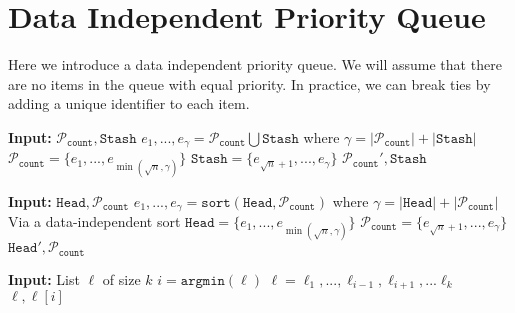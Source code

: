 \section{Data Independent Priority Queue}
Here we introduce a data independent priority queue. We will assume that there are no items in the queue
with equal priority. In practice, we can break ties by adding a unique identifier to each item.

\newcommand{\DIPQhead}{\texttt{Head}}
\newcommand{\DIPQstash}{\texttt{Stash}}
\newcommand{\DIPQcounter}{{\texttt{count}}}
\newcommand{\DIPQpartition}{\mathcal{P}}
\newcommand{\MergeFill}{\texttt{MergeFill}}
\newcommand{\Fill}{\texttt{Fill}}
\newcommand{\ExtractSmallest}{\texttt{ExtractSmallest}}
\newcommand{\sqrtn}{{\sqrt{n}}}
\newcommand{\good}{\mathcal{G}}
\newcommand{\bad}{\mathcal{B}}


\begin{algorithm}
	\caption{$\Fill$}
	\label{alg:Fill}
	\begin{algorithmic}[1]
			\State \textbf{Input:} $\DIPQpartition_\DIPQcounter, \DIPQstash$
			\State $e_1, ..., e_\gamma = \DIPQpartition_\DIPQcounter \bigcup \DIPQstash$ where $\gamma = |\DIPQpartition_\DIPQcounter| + |\DIPQstash|$
			\State $\DIPQpartition_\DIPQcounter = \{e_1, ..., e_{\min(\sqrtn, \gamma)}\}$
			\State $\DIPQstash = \{e_{\sqrtn + 1}, ..., e_\gamma\}$
			\State \Return $\DIPQpartition_\DIPQcounter', \DIPQstash$
	\end{algorithmic}
\end{algorithm}

\begin{algorithm}
	\caption{$\MergeFill$}
	\label{alg:MergeFill}
	\begin{algorithmic}[1]
			\State \textbf{Input:} $\DIPQhead, \DIPQpartition_\DIPQcounter$
			\State $e_1, ..., e_\gamma = \texttt{sort}(\DIPQhead, \DIPQpartition_\DIPQcounter)$ where $\gamma = |\DIPQhead| + |\DIPQpartition_\DIPQcounter|$ \Comment Via a data-independent sort
			\State $\DIPQhead = \{e_1, ..., e_{\min\left(\sqrtn, \gamma\right)}\}$
			\State $\DIPQpartition_\DIPQcounter = \{e_{\sqrtn + 1}, ..., e_\gamma\}$
			\State \Return $\DIPQhead', \DIPQpartition_\DIPQcounter$
	\end{algorithmic}
\end{algorithm}

\begin{algorithm}
	\caption{$\ExtractSmallest$}
	\begin{algorithmic}[1]
			\State \textbf{Input:} List $\ell$ of size $k$
			\State $i = \texttt{argmin}(\ell)$
			\State $\ell = \ell_1, ..., \ell_{i - 1}, \ell_{i + 1}, ... \ell_k$
			\State \Return $\ell, \ell[i]$
	\end{algorithmic}
\end{algorithm}

